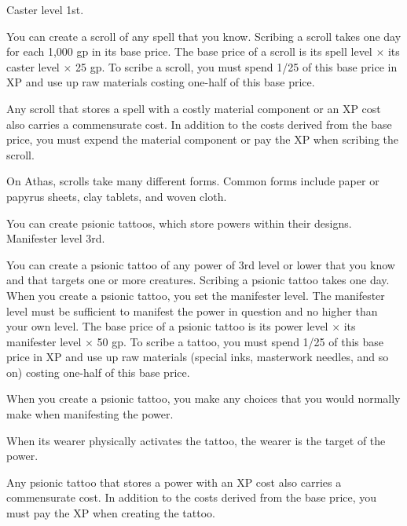{}
{Caster level 1st.}
{You can create a scroll of any spell that you know. Scribing a scroll takes one day for each 1,000 gp in its base price. The base price of a scroll is its spell level $\times$ its caster level $\times$ 25 gp. To scribe a scroll, you must spend 1/25 of this base price in XP and use up raw materials costing one-half of this base price.

Any scroll that stores a spell with a costly material component or an XP cost also carries a commensurate cost. In addition to the costs derived from the base price, you must expend the material component or pay the XP when scribing the scroll.}
{}
{On Athas, scrolls take many different forms. Common forms include paper or papyrus sheets, clay tablets, and woven cloth.}

{You can create psionic tattoos, which store powers within their designs.}
{Manifester level 3rd.}
{You can create a psionic tattoo of any power of 3rd level or lower that you know and that targets one or more creatures. Scribing a psionic tattoo takes one day. When you create a psionic tattoo, you set the manifester level. The manifester level must be sufficient to manifest the power in question and no higher than your own level. The base price of a psionic tattoo is its power level $\times$ its manifester level $\times$ 50 gp. To scribe a tattoo, you must spend 1/25 of this base price in XP and use up raw materials (special inks, masterwork needles, and so on) costing one-half of this base price.

When you create a psionic tattoo, you make any choices that you would normally make when manifesting the power.

When its wearer physically activates the tattoo, the wearer is the target of the power.

Any psionic tattoo that stores a power with an XP cost also carries a commensurate cost. In addition to the costs derived from the base price, you must pay the XP when creating the tattoo.}{}{}
